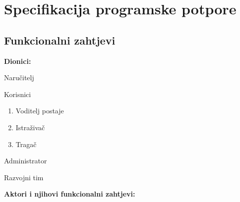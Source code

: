 \chapter{Specifikacija programske potpore}
		
	\section{Funkcionalni zahtjevi}
			
			\noindent \textbf{Dionici:}
			
			\begin{packed_enum}
				
				\item Naručitelj
				\item Korisnici
				\begin{enumerate}
					\item Voditelj postaje
					\item Istraživač
					\item Tragač
				\end{enumerate}		
				\item Administrator
				\item Razvojni tim 
				
			\end{packed_enum}
			
			\noindent \textbf{Aktori i njihovi funkcionalni zahtjevi:}
			
